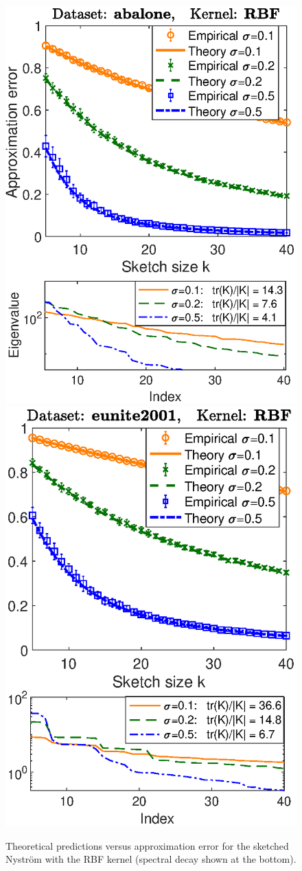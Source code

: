 \documentclass[../../thesis.tex]{subfiles}
\begin{document}
\begin{figure}
  \centering
  \includegraphics[width=.43\textwidth]{abalone-nystrom}\nobreak\includegraphics[width=.43\textwidth]{eunite-nystrom}
  \caption{Theoretical predictions versus approximation error for the
    sketched Nystr\"om with the RBF kernel
    (spectral decay shown at the bottom).}\label{f:nystrom}
\end{figure}
\end{document}
